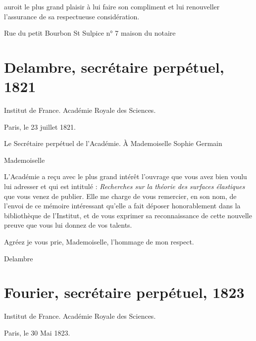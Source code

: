 \documentclass[11pt,a4paper]{article}
\begin{document}

auroit le plus grand plaisir à lui faire son compliment et lui renouveller
l'assurance de sa respectueuse considération.

Rue du petit Bourbon St Sulpice n° 7 maison du notaire

\section{Delambre, secrétaire perpétuel, 1821}


Institut de France. Académie Royale des Sciences.

Paris, le 23 juillet 1821.

Le Secrétaire perpétuel de l'Académie. À Mademoiselle Sophie Germain

Mademoiselle

L'Académie a reçu avec le plus grand intérêt l'ouvrage que vous avez bien
voulu lui adresser et qui est intitulé : \emph{Recherches sur la théorie des
surfaces élastiques} que vous venez de publier. Elle me charge de vous
remercier, en son nom, de l'envoi de ce mémoire intéressant qu'elle a fait
déposer honorablement dans la bibliothèque de l'Institut, et de vous exprimer
sa reconnaissance de cette nouvelle preuve que vous lui donnez de vos talents.

Agréez je vous prie, Mademoiselle, l'hommage de mon respect.

Delambre

\section{Fourier, secrétaire perpétuel, 1823}


Institut de France. Académie Royale des Sciences.

Paris, le 30 Mai 1823.
\end{document}
